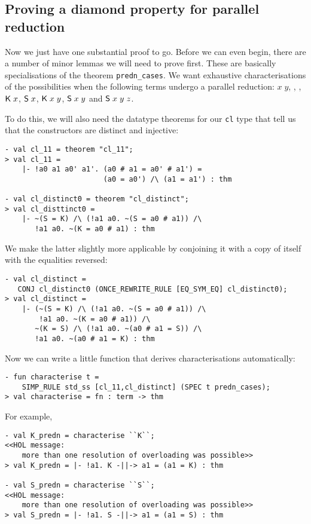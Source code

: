 \documentclass[12pt]{article}
\newcommand{\KC}{\con{K}}
\newcommand{\SC}{\con{S}}
\begin{document}
\subsection{Proving a diamond property for parallel reduction}
\label{sec:predn-diamond}

Now we just have one substantial proof to go.  Before we can even
begin, there are a number of minor lemmas we will need to prove first.
These are basically specialisations of the theorem
\texttt{predn\_cases}.  We want exhaustive characterisations of the
possibilities when the following terms undergo a parallel reduction:
$x\;y$, \KC, \SC, $\KC\;x$, $\SC\;x$, $\KC\;x\;y$, $\SC\;x\;y$ and
$\SC\;x\;y\;z$.

To do this, we will also need the datatype theorems for our
\texttt{cl} type that tell us that the constructors are distinct and
injective:
\begin{session}\begin{verbatim}
- val cl_11 = theorem "cl_11";
> val cl_11 =
    |- !a0 a1 a0' a1'. (a0 # a1 = a0' # a1') =
                       (a0 = a0') /\ (a1 = a1') : thm

- val cl_distinct0 = theorem "cl_distinct";
> val cl_disttinct0 =
    |- ~(S = K) /\ (!a1 a0. ~(S = a0 # a1)) /\
       !a1 a0. ~(K = a0 # a1) : thm
\end{verbatim}\end{session}
We make the latter slightly more applicable by conjoining it with
a copy of itself with the equalities reversed:
\begin{session}\begin{verbatim}
- val cl_distinct =
   CONJ cl_distinct0 (ONCE_REWRITE_RULE [EQ_SYM_EQ] cl_distinct0);
> val cl_distinct =
    |- (~(S = K) /\ (!a1 a0. ~(S = a0 # a1)) /\
        !a1 a0. ~(K = a0 # a1)) /\
       ~(K = S) /\ (!a1 a0. ~(a0 # a1 = S)) /\
       !a1 a0. ~(a0 # a1 = K) : thm
\end{verbatim}\end{session}
    Now we can write a little function that derives characterisations
    automatically:
\begin{session}\begin{verbatim}
- fun characterise t =
    SIMP_RULE std_ss [cl_11,cl_distinct] (SPEC t predn_cases);
> val characterise = fn : term -> thm
\end{verbatim}\end{session}
For example,
\begin{session}\begin{verbatim}
- val K_predn = characterise ``K``;
<<HOL message:
    more than one resolution of overloading was possible>>
> val K_predn = |- !a1. K -||-> a1 = (a1 = K) : thm

- val S_predn = characterise ``S``;
<<HOL message:
    more than one resolution of overloading was possible>>
> val S_predn = |- !a1. S -||-> a1 = (a1 = S) : thm
\end{verbatim}\end{session}
\end{document}
